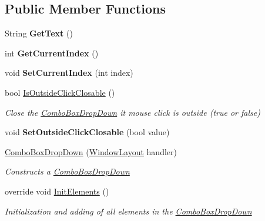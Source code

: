 \subsection*{Public Member Functions}
\begin{DoxyCompactItemize}
\item 
\mbox{\label{class_space_v_i_l_1_1_combo_box_drop_down_a4026aea3ae619ae954f18bca4a8896db}} 
String {\bfseries Get\+Text} ()
\item 
\mbox{\label{class_space_v_i_l_1_1_combo_box_drop_down_a9b6a74bb2d5890be0f6dd9a3c469ff4a}} 
int {\bfseries Get\+Current\+Index} ()
\item 
\mbox{\label{class_space_v_i_l_1_1_combo_box_drop_down_ab55285b860cffcad10b6e04fee0a3486}} 
void {\bfseries Set\+Current\+Index} (int index)
\item 
bool \mbox{\hyperlink{class_space_v_i_l_1_1_combo_box_drop_down_a9c7ae751788129978bd5977e1295ba47}{Is\+Outside\+Click\+Closable}} ()
\begin{DoxyCompactList}\small\item\em Close the \mbox{\hyperlink{class_space_v_i_l_1_1_combo_box_drop_down}{Combo\+Box\+Drop\+Down}} it mouse click is outside (true or false) \end{DoxyCompactList}\item 
\mbox{\label{class_space_v_i_l_1_1_combo_box_drop_down_ad6280fa6545faeb5a368ebd4445f1de4}} 
void {\bfseries Set\+Outside\+Click\+Closable} (bool value)
\item 
\mbox{\hyperlink{class_space_v_i_l_1_1_combo_box_drop_down_a898ab2962be22a43b6d9910549b95a41}{Combo\+Box\+Drop\+Down}} (\mbox{\hyperlink{class_space_v_i_l_1_1_window_layout}{Window\+Layout}} handler)
\begin{DoxyCompactList}\small\item\em Constructs a \mbox{\hyperlink{class_space_v_i_l_1_1_combo_box_drop_down}{Combo\+Box\+Drop\+Down}} \end{DoxyCompactList}\item 
override void \mbox{\hyperlink{class_space_v_i_l_1_1_combo_box_drop_down_aa38b0ff2634defca3efb3a25e0a599cf}{Init\+Elements}} ()
\begin{DoxyCompactList}\small\item\em Initialization and adding of all elements in the \mbox{\hyperlink{class_space_v_i_l_1_1_combo_box_drop_down}{Combo\+Box\+Drop\+Down}} \end{DoxyCompactList}\item 

\end{DoxyCompactItemize}
